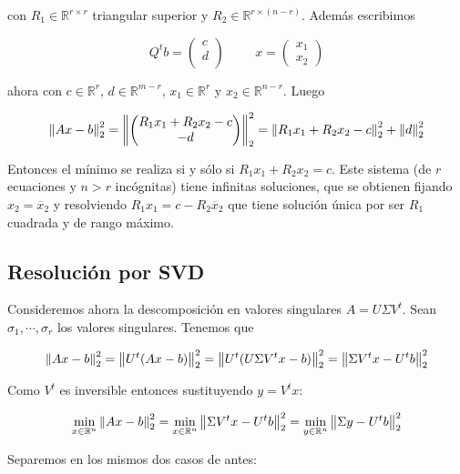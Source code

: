 \begin{itemize}
con $R_1 \in \mathbb{R}^{r \times r}$ triangular superior y $R_2 \in \mathbb{R}^{r \times (n - r)}$. Además escribimos

\[Q^tb = \begin{pmatrix}
c 	\\
d	\\
\end{pmatrix} \hspace{1cm}
x = \begin{pmatrix}
x_1 \\
x_2
\end{pmatrix}
\]

ahora con $c \in \mathbb{R}^r$, $d \in \mathbb{R}^{m - r}$, $x_1 \in \mathbb{R}^r$ y $x_2 \in \mathbb{R}^{n - r}$. Luego

\[\left\lVert Ax - b\right\rVert_2^2 = \left\lVert\begin{pmatrix}
R_1 x_1 + R_2 x_2 - c\\
-d
\end{pmatrix}\right\rVert_2^2 = 
\left\lVert R_1 x_1 + R_2 x_2 - c\right\rVert_2^2 + \left\lVert d\right\rVert_2^2
\]

Entonces el mínimo se realiza si y sólo si $R_1 x_1 + R_2 x_2 = c$. Este sistema (de $r$ ecuaciones y $n > r$ incógnitas) tiene infinitas soluciones, que se obtienen fijando $x_2 = \overline{x}_2$ y resolviendo $R_1 x_1 = c - R_2 \overline{x}_2$ que tiene solución única por ser $R_1$ cuadrada y de rango máximo.

\end{itemize}

\subsection{Resolución por SVD}

Consideremos ahora la descomposición en valores singulares $A = U \Sigma V^t$. Sean $\sigma_1, \cdots, \sigma_r$ los valores singulares. Tenemos que

\[\left\lVert Ax - b\right\rVert_2^2 = \left\lVert U^t(Ax - b)\right\rVert_2^2 = \left\lVert U^t(U\Sigma V^tx - b)\right\rVert_2^2 = \left\lVert\Sigma V^t x - U^t b\right\rVert_2^2\]

Como $V^t$ es inversible entonces sustituyendo $y = V^tx$: 

\[\min\limits_{x \in \mathbb{R}^n} \left\lVert Ax - b\right\rVert_2^2 = \min\limits_{x \in \mathbb{R}^n} \left\lVert\Sigma V^t x - U^t b\right\rVert_2^2  = \min \limits_{y \in \mathbb{R}^n} \left\lVert\Sigma y - U^tb\right\rVert_2^2\]

Separemos en los mismos dos casos de antes:

